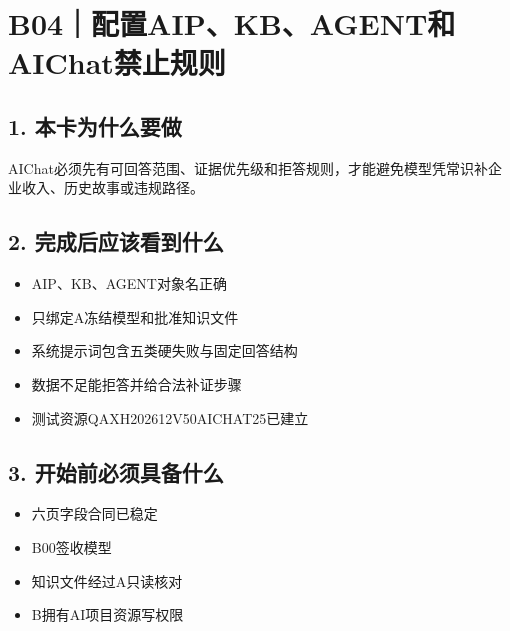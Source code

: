 \documentclass[UTF8,openany,zihao=-4]{ctexbook}
\renewcommand{\_}{\textunderscore\allowbreak}
\begin{document}
\clearpage
\section{B04｜配置AIP、KB、AGENT和AIChat禁止规则}
\subsection*{1. 本卡为什么要做}
AIChat必须先有可回答范围、证据优先级和拒答规则，才能避免模型凭常识补企业收入、历史故事或违规路径。


\subsection*{2. 完成后应该看到什么}
\begin{itemize}
\item AIP、KB、AGENT对象名正确
\item 只绑定A冻结模型和批准知识文件
\item 系统提示词包含五类硬失败与固定回答结构
\item 数据不足能拒答并给合法补证步骤
\item 测试资源QA\_XH202612\_V50\_AICHAT\_25已建立
\end{itemize}

\subsection*{3. 开始前必须具备什么}
\begin{itemize}[label=$\square$]
\item 六页字段合同已稳定
\item B00签收模型
\item 知识文件经过A只读核对
\item B拥有AI项目资源写权限
\end{itemize}
\end{document}
